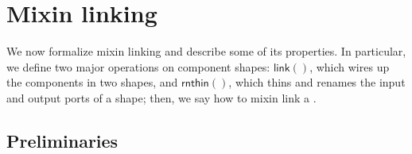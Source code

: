 \chapter{Mixin linking} %
\label{sec:mix-in}

We now formalize mixin linking and describe some of its properties.
In particular, we define two major operations
on component shapes: $\textsf{link}()$, which wires up the components in
two shapes, and $\textsf{rnthin}()$, which thins and renames the input
and output ports of a shape; then, we say how to mixin link a
\ccomp{}.

\section{Preliminaries}

